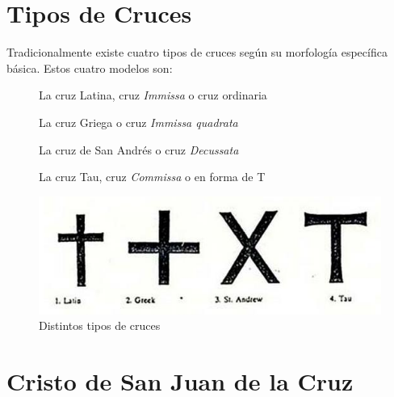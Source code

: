 \section{Tipos de Cruces} \label{app:crosses}

Tradicionalmente existe cuatro tipos de cruces según su morfología específica básica. Estos cuatro modelos son:

\begin{description}
\item[] La cruz Latina, cruz \textit{Immissa} o cruz ordinaria
\item[] La cruz Griega o cruz \textit{Immissa quadrata}
\item[] La cruz de San Andrés o cruz \textit{Decussata}
\item[] La cruz Tau, cruz \textit{Commissa} o en forma de T
\end{description}


\begin{figure}[H]
    \centering
    \includegraphics[width=1\textwidth]{cruces.jpg}
    \caption{Distintos tipos de cruces} %
\end{figure}

\section{Cristo de San Juan de la Cruz} \label{app:sanjuan}

